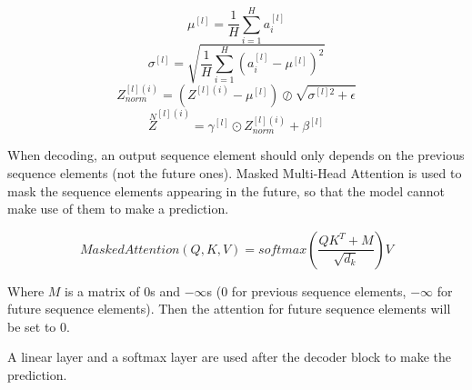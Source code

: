 \documentclass{article}
\begin{document}
\[\mu^{[l]} = \frac{1}{H} \sum_{i = 1}^{H} a_{i}^{[l]}\]
\[\sigma^{[l]} = \sqrt{\frac{1}{H} \sum_{i = 1}^{H} (a_{i}^{[l]} - \mu^{[l]})^{2}}\]
\[Z^{[l](i)}_{norm} = (Z^{[l](i)} - \mu^{[l]}) \oslash \sqrt{\sigma^{[l]2} + \epsilon}\]
\[\overset{N}{Z}^{[l](i)} = \gamma^{[l]} \odot Z^{[l](i)}_{norm} + \beta^{[l]}\]

\noindent When decoding, an output sequence element should only depends on the previous sequence elements (not the future ones). Masked Multi-Head Attention is used to mask the sequence elements appearing in the future, so that the model cannot make use of them to make a prediction.

\[MaskedAttention(Q, K, V) = softmax(\frac{QK^{T} + M}{\sqrt{d_{k}}}) V\]

\noindent Where \(M\) is a matrix of \(0\)s and \(-\infty\)s (\(0\) for previous sequence elements, \(-\infty\) for future sequence elements). Then the attention for future sequence elements will be set to \(0\).

\bigskip

\noindent A linear layer and a softmax layer are used after the decoder block to make the prediction.

\printindex
\end{document}
